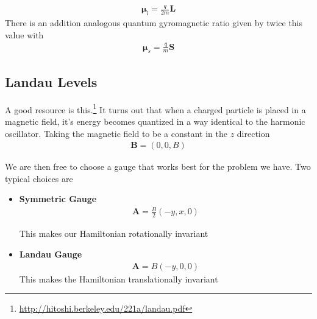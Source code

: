 \begin{align}
\boldsymbol{\mu}_l = \frac{q}{2m}\textbf{L}
\end{align}
There is an addition analogous quantum gyromagnetic ratio given by twice this value with
\begin{align}
\boldsymbol{\mu}_s = \frac{q}{m}\textbf{S}
\end{align}



\subsection{Landau Levels}
A good resource is this.\footnote{\url{http://hitoshi.berkeley.edu/221a/landau.pdf}} It turns out that when a charged particle is placed in a magnetic field, it's energy becomes quantized in a way identical to the harmonic oscillator. Taking the magnetic field to be a constant in the $z$ direction
\begin{align}
\textbf{B} = (0,0,B)
\end{align}


 We are then free to choose a gauge that works best for the problem we have. Two typical choices are

\begin{itemize}
\item \textbf{Symmetric Gauge}
\begin{align}
\textbf{A} = \frac{B}{2}(-y,x,0)
\end{align}

This makes our Hamiltonian rotationally invariant


\item \textbf{Landau Gauge}
\begin{align}
\textbf{A} = B(-y,0,0)
\end{align}
This makes the Hamiltonian translationally invariant
\end{itemize}

